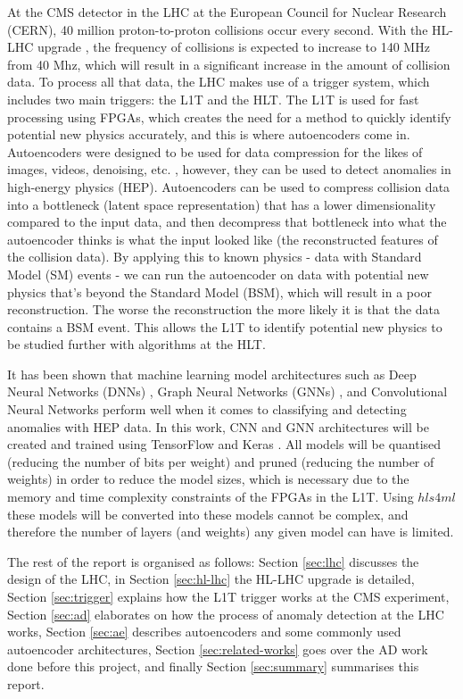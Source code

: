 \documentclass[a4paper]{article}
\theoremstyle{plain}
\theoremstyle{definition}
\begin{document}
    At the CMS detector in the LHC at the European Council for Nuclear Research (CERN), 40 million proton-to-proton collisions occur every second. With the HL-LHC upgrade \cite{hl-lhc}, the frequency of collisions is expected to increase to 140 MHz from 40 Mhz, which will result in a significant increase in the amount of collision data. To process all that data, the LHC makes use of a  trigger system, which includes two main triggers: the L1T and the HLT. The L1T is used for fast processing using FPGAs, which creates the need for a method to quickly identify potential new physics accurately, and this is where autoencoders come in. Autoencoders \cite{autoencoders} were designed to be used for data compression for the likes of images, videos, denoising, etc. \cite{image-autoencoder}, however, they can be used to detect anomalies in high-energy physics (HEP). Autoencoders can be used to compress collision data into a bottleneck (latent space representation) that has a lower dimensionality compared to the input data, and then decompress that bottleneck into what the autoencoder thinks is what the input looked like (the reconstructed features of the collision data). By applying this to known physics - data with Standard Model (SM) events - we can run the autoencoder on data with potential new physics that's beyond the Standard Model (BSM), which will result in a poor reconstruction. The worse the reconstruction the more likely it is that the data contains a BSM event. This allows the L1T to identify potential new physics to be studied further with algorithms at the HLT.
    
    It has been shown that machine learning model architectures such as Deep Neural Networks (DNNs) \cite{dnn}, Graph Neural Networks (GNNs) \cite{garnet, garnet2}, and Convolutional Neural Networks \cite{katya} perform well when it comes to classifying and detecting anomalies with HEP data.  In this work, CNN and GNN architectures will be created and trained using TensorFlow \cite{tensorflow} and Keras \cite{keras}. All models will be quantised (reducing the number of bits per weight) and pruned (reducing the number of weights) in order to reduce the model sizes, which is necessary due to the memory and time complexity constraints of the FPGAs in the L1T. Using $hls4ml$ \cite{hls4ml2, dnn} these models will be converted into these models cannot be complex, and therefore the number of layers (and weights) any given model can have is limited. 
    
    The rest of the report is organised as follows: Section \ref{sec:lhc} discusses the design of the LHC, in Section \ref{sec:hl-lhc} the HL-LHC upgrade is detailed, Section \ref{sec:trigger} explains how the L1T trigger works at the CMS experiment, Section \ref{sec:ad} elaborates on how the process of anomaly detection at the LHC works, Section \ref{sec:ae} describes autoencoders and some commonly used autoencoder architectures, Section \ref{sec:related-works} goes over the AD work done before this project, and finally Section \ref{sec:summary} summarises this report. 
	
\end{document}
